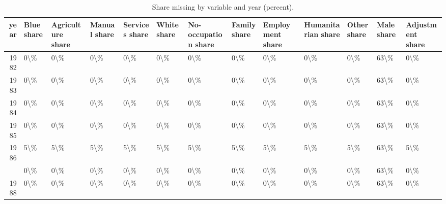 \begin{table}

\caption{Share missing by variable and year (percent).}
\centering
\begin{tabular}[t]{rllllllllllll}
\toprule
year & Blue share & Agriculture share & Manual share & Services share & White share & No-occupation share & Family share & Employment share & Humanitarian share & Other share & Male share & Adjustment share\\
\midrule
1982 & 0\textbackslash{}\% & 0\textbackslash{}\% & 0\textbackslash{}\% & 0\textbackslash{}\% & 0\textbackslash{}\% & 0\textbackslash{}\% & 0\textbackslash{}\% & 0\textbackslash{}\% & 0\textbackslash{}\% & 0\textbackslash{}\% & 63\textbackslash{}\% & 0\textbackslash{}\%\\
1983 & 0\textbackslash{}\% & 0\textbackslash{}\% & 0\textbackslash{}\% & 0\textbackslash{}\% & 0\textbackslash{}\% & 0\textbackslash{}\% & 0\textbackslash{}\% & 0\textbackslash{}\% & 0\textbackslash{}\% & 0\textbackslash{}\% & 63\textbackslash{}\% & 0\textbackslash{}\%\\
1984 & 0\textbackslash{}\% & 0\textbackslash{}\% & 0\textbackslash{}\% & 0\textbackslash{}\% & 0\textbackslash{}\% & 0\textbackslash{}\% & 0\textbackslash{}\% & 0\textbackslash{}\% & 0\textbackslash{}\% & 0\textbackslash{}\% & 63\textbackslash{}\% & 0\textbackslash{}\%\\
1985 & 0\textbackslash{}\% & 0\textbackslash{}\% & 0\textbackslash{}\% & 0\textbackslash{}\% & 0\textbackslash{}\% & 0\textbackslash{}\% & 0\textbackslash{}\% & 0\textbackslash{}\% & 0\textbackslash{}\% & 0\textbackslash{}\% & 63\textbackslash{}\% & 0\textbackslash{}\%\\
1986 & 5\textbackslash{}\% & 5\textbackslash{}\% & 5\textbackslash{}\% & 5\textbackslash{}\% & 5\textbackslash{}\% & 5\textbackslash{}\% & 5\textbackslash{}\% & 5\textbackslash{}\% & 5\textbackslash{}\% & 5\textbackslash{}\% & 63\textbackslash{}\% & 5\textbackslash{}\%\\
\addlinespace
1987 & 0\textbackslash{}\% & 0\textbackslash{}\% & 0\textbackslash{}\% & 0\textbackslash{}\% & 0\textbackslash{}\% & 0\textbackslash{}\% & 0\textbackslash{}\% & 0\textbackslash{}\% & 0\textbackslash{}\% & 0\textbackslash{}\% & 63\textbackslash{}\% & 0\textbackslash{}\%\\
1988 & 0\textbackslash{}\% & 0\textbackslash{}\% & 0\textbackslash{}\% & 0\textbackslash{}\% & 0\textbackslash{}\% & 0\textbackslash{}\% & 0\textbackslash{}\% & 0\textbackslash{}\% & 0\textbackslash{}\% & 0\textbackslash{}\% & 63\textbackslash{}\% & 0\textbackslash{}\%\\

\end{tabular}
\end{table}
